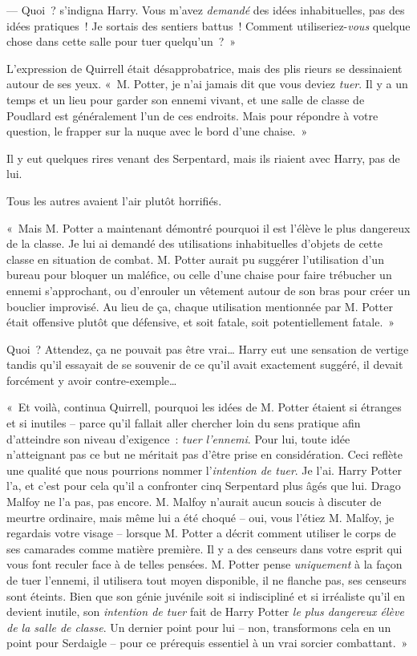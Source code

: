 --- Quoi~? s'indigna Harry.
Vous m'avez \emph{demandé} des idées inhabituelles, pas des idées pratiques~!
Je sortais des sentiers battus~!
Comment utiliseriez-\emph{vous} quelque chose dans cette salle pour tuer quelqu'un~?~»

L'expression de Quirrell était désapprobatrice, mais des plis rieurs se dessinaient autour de ses yeux.
«~M. Potter, je n'ai jamais dit que vous deviez \emph{tuer}.
Il y a un temps et un lieu pour garder son ennemi vivant, et une salle de classe de Poudlard est généralement l'un de ces endroits.
Mais pour répondre à votre question, le frapper sur la nuque avec le bord d'une chaise.~»

Il y eut quelques rires venant des Serpentard, mais ils riaient avec Harry, pas de lui.

Tous les autres avaient l'air plutôt horrifiés.

«~Mais M. Potter a maintenant démontré pourquoi il est l'élève le plus dangereux de la classe.
Je lui ai demandé des utilisations inhabituelles d'objets de cette classe en situation de combat.
M. Potter aurait pu suggérer l'utilisation d'un bureau pour bloquer un maléfice, ou celle d'une chaise pour faire trébucher un ennemi s'approchant, ou d'enrouler un vêtement autour de son bras pour créer un bouclier improvisé.
Au lieu de ça, chaque utilisation mentionnée par M. Potter était offensive plutôt que défensive, et soit fatale, soit potentiellement fatale.~»

Quoi~? Attendez, ça ne pouvait pas être vrai…
Harry eut une sensation de vertige tandis qu'il essayait de se souvenir de ce qu'il avait exactement suggéré, il devait forcément y avoir contre-exemple…

«~Et voilà, continua Quirrell, pourquoi les idées de M. Potter étaient si étranges et si inutiles -- parce qu'il fallait aller chercher loin du sens pratique afin d'atteindre son niveau d'exigence~: \emph{tuer l'ennemi}.
Pour lui, toute idée n'atteignant pas ce but ne méritait pas d'être prise en considération.
Ceci reflète une qualité que nous pourrions nommer l'\emph{intention de tuer}.
Je l'ai.
Harry Potter l'a, et c'est pour cela qu'il a confronter cinq Serpentard plus âgés que lui.
Drago Malfoy ne l'a pas, pas encore.
M. Malfoy n'aurait aucun soucis à discuter de meurtre ordinaire, mais même lui a été choqué -- oui, vous l'étiez M. Malfoy, je regardais votre visage -- lorsque M. Potter a décrit comment utiliser le corps de ses camarades comme matière première.
Il y a des censeurs dans votre esprit qui vous font reculer face à de telles pensées.
M. Potter pense \emph{uniquement} à la façon de tuer l'ennemi, il utilisera tout moyen disponible, il ne flanche pas, ses censeurs sont éteints.
Bien que son génie juvénile soit si indiscipliné et si irréaliste qu'il en devient inutile, son \emph{intention de tuer} fait de Harry Potter \emph{le plus dangereux élève de la salle de classe}.
Un dernier point pour lui -- non, transformons cela en un point pour Serdaigle -- pour ce prérequis essentiel à un vrai sorcier combattant.~»

